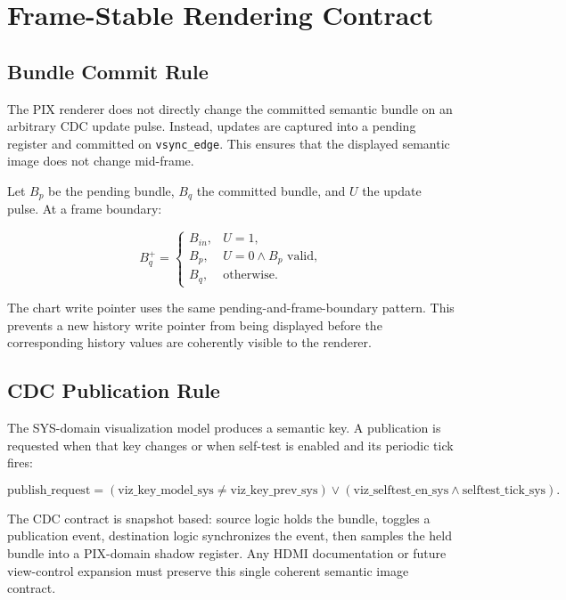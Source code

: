 \documentclass[letterpaper, final, onecolumn, titlepage]{article}
\DeclareRobustCommand{\sig}[1]{\nolinkurl{#1}}
\begin{document}
\section{Frame-Stable Rendering Contract}

\subsection{Bundle Commit Rule}

The PIX renderer does not directly change the committed semantic bundle on an
arbitrary CDC update pulse. Instead, updates are captured into a pending register
and committed on \sig{vsync_edge}. This ensures that the displayed semantic image
does not change mid-frame.

Let $B_p$ be the pending bundle, $B_q$ the committed bundle, and $U$ the update
pulse. At a frame boundary:

\begin{equation}
B_q^{+} =
\begin{cases}
B_{in}, & U=1,\\
B_p, & U=0 \land B_p \text{ valid},\\
B_q, & \text{otherwise}.
\end{cases}
\label{eq:bundle-commit}
\end{equation}

The chart write pointer uses the same pending-and-frame-boundary pattern. This
prevents a new history write pointer from being displayed before the corresponding
history values are coherently visible to the renderer.

\subsection{CDC Publication Rule}

The SYS-domain visualization model produces a semantic key. A publication is
requested when that key changes or when self-test is enabled and its periodic
tick fires:

\begin{equation}
\mathrm{publish\_request}
 =
(\mathrm{viz\_key\_model\_sys} \ne \mathrm{viz\_key\_prev\_sys})
\lor
(\mathrm{viz\_selftest\_en\_sys} \land \mathrm{selftest\_tick\_sys}).
\label{eq:publish-request}
\end{equation}

The CDC contract is snapshot based: source logic holds the bundle, toggles a
publication event, destination logic synchronizes the event, then samples the
held bundle into a PIX-domain shadow register. Any HDMI documentation or future
view-control expansion must preserve this single coherent semantic image
contract.
\end{document}
